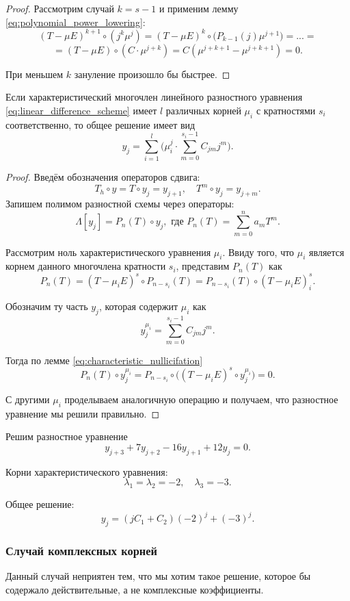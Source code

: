 \documentclass[../main.tex]{subfile}
\begin{document}
\begin{proof}
	Рассмотрим случай $k=s-1$ и применим лемму
	\eqref{eq:polynomial_power_lowering}:
	\[(T-\mu E)^{k+1}\circ(j^k\mu^j)=(T-\mu E)^k\circ\big(P_{k-1}(j)\mu^
	{j+1}\big)=...=\]
	\[=(T-\mu E)\circ(C\cdot\mu^{j+k})=C(\mu^{j+k+1}-\mu^{j+k+1})=0.\]

	При меньшем $k$ зануление произошло бы быстрее.
\end{proof}

\begin{theorem}\label{eq:repeated_characteristics}
	Если характеристический многочлен линейного разностного уравнения
	\eqref{eq:linear_difference_scheme} имеет $l$ различных корней $\mu_i$
	с кратностями $s_i$ соответственно, то общее решение имеет вид
	\[\boxed{y_j=\sum_{i=1}^{l}\big(\mu_i^j\cdot\sum_{m=0}^{s_i-1}C_{jm}j^m
	\big)}.\]
\end{theorem}

\begin{proof}
	Введём обозначения операторов сдвига:
	\[T_h\circ y=T\circ y_j=y_{j+1},\quad T^m\circ y_j=y_{j+m}.\]
	Запишем полимом разностной схемы через операторы:
	\[\Lambda[y_j]=P_n(T)\circ y_j, \text{ где } P_n(T)=\sum_{m=0}^{n}a_m
	T^m.\]

	Рассмотрим ноль характеристического уравнения $\mu_i$. Ввиду того, что
	$\mu_i$ является корнем данного многочлена кратности $s_i$, представим
	$P_n(T)$ как
	\[P_n(T)=(T-\mu_i E)^s\circ P_{n-s_i}(T)=P_{n-s_i}(T)\circ(T-\mu_i E)
	^s_i.\]

	Обозначим ту часть $y_j$, которая содержит $\mu_i$ как
	\[y_j^{\mu_i}=\sum_{m=0}^{s_i-1}C_{jm}j^m.\]

	Тогда по лемме \eqref{eq:characteristic_nullicifation}
	\[P_n(T)\circ y_j^{\mu_i}=P_{n-s_i}\circ\big((T-\mu_i E)^s\circ y_j^
	{\mu_i}\big)=0.\]

	С другими $\mu_i$ проделываем аналогичную операцию и получаем, что
	разностное уравнение мы решили правильно.
\end{proof}
\begin{example}
	Решим разностное уравнение
	\[y_{j+3}+7y_{j+2}-16y_{j+1}+12y_j=0.\]

	Корни характеристического уравнения:
	\[\lambda_1=\lambda_2=-2,\quad\lambda_3=-3.\]

	Общее решение:
	\[y_j=(jC_1+C_2)(-2)^j+(-3)^j.\]
\end{example}

\subsubsection{Случай комплексных корней}
Данный случай неприятен тем, что мы хотим такое решение, которое бы содержало
действительные, а не комплексные коэффициенты.
\end{document}
